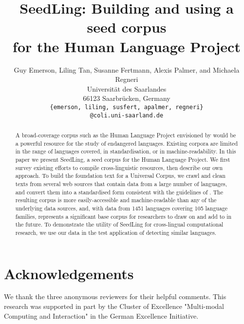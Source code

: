 \documentclass[11pt]{article}
\title{SeedLing: Building and using a seed corpus \\ for the Human Language Project}
\author{Guy Emerson, Liling Tan, Susanne Fertmann, Alexis Palmer, and Michaela Regneri \\
Universität des Saarlandes \\
66123 Saarbrücken, Germany \\
{\tt \{emerson, liling, susfert, apalmer, regneri\}} \\
{\tt @coli.uni-saarland.de}}
\date{}
\newcommand{\bluenote}[1]{\textcolor{blue}{[#1]}}
\begin{document}
\maketitle
\begin{abstract}
  A broad-coverage corpus such as the Human Language Project
  envisioned by  would be a powerful
  resource for the study of endangered languages.
  Existing corpora are limited in the range of languages covered, in
  standardisation, or in machine-readability. In this paper we present
  SeedLing, a seed corpus for the Human Language Project. We first
  survey existing efforts to compile cross-linguistic resources, then
  describe our own approach. To build the foundation text for a
  Universal Corpus, we crawl and clean texts from several web sources
  that contain data from a large number of languages, and convert them
  into a standardised form consistent with the guidelines of
  . The resulting corpus is more
  easily-accessible and machine-readable than any of the underlying
  data sources, and, with data from 1451 languages covering 105
  language families, represents a significant base corpus for
  researchers to draw on and add to in the future. To demonstrate the
  utility of SeedLing for cross-lingual computational research, we use our
  data in the test application of detecting similar languages.
\end{abstract}









\section*{Acknowledgements}
We thank the three anonymous reviewers for their helpful comments. This research was supported in part by the Cluster of Excellence "Multi-modal Computing and Interaction" in the German Excellence Initiative.


\end{document}
